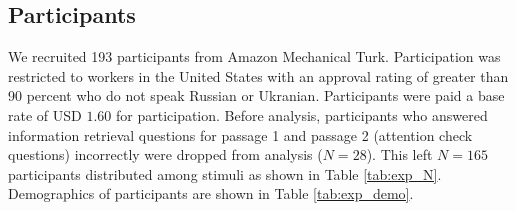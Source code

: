 


\begin{table}[]
\caption{N for each condition. }
\label{tab:exp_N}
\end{table}

\subsection{Participants} 

We recruited 193 participants from Amazon Mechanical Turk. Participation was restricted to
workers in the United States with an approval rating of greater than 90 percent who do not speak Russian or Ukranian. Participants were paid a base rate of USD $1.60$ for participation. Before analysis, participants who answered information retrieval questions for passage 1 and passage 2 (attention check questions) incorrectly were dropped from analysis ($N = 28$).  This left $N = 165$ participants distributed among stimuli as shown in Table \ref{tab:exp_N}. Demographics of participants are shown in Table \ref{tab:exp_demo}.


